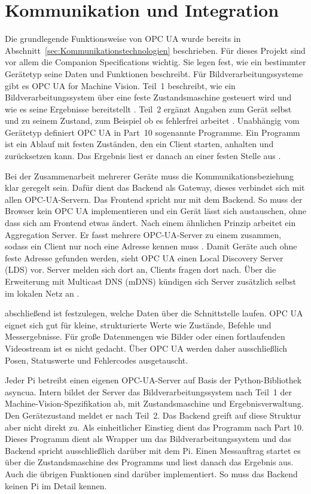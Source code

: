  \section{Kommunikation und Integration}
 \label{sec:communikation_intergration}
 Die grundlegende Funktionsweise von OPC UA wurde bereits in Abschnitt~\ref{sec:Kommunikationstechnologien} beschrieben. Für dieses Projekt sind vor allem die Companion Specifications wichtig. Sie legen fest, wie ein bestimmter Gerätetyp seine Daten und Funktionen beschreibt. Für Bildverarbeitungssysteme gibt es OPC UA for Machine Vision. Teil~1 beschreibt, wie ein Bildverarbeitungssystem über eine feste Zustandsmaschine gesteuert wird und wie es seine Ergebnisse bereitstellt \cite{OPC40100-1}. Teil~2 ergänzt Angaben zum Gerät selbst und zu seinem Zustand, zum Beispiel ob es fehlerfrei arbeitet \cite{OPC40100-2}. Unabhängig vom Gerätetyp definiert OPC UA in Part~10 sogenannte Programme. Ein Programm ist ein Ablauf mit festen Zuständen, den ein Client starten, anhalten und zurücksetzen kann. Das Ergebnis liest er danach an einer festen Stelle aus \cite{OPC10000-10}.

Bei der Zusammenarbeit mehrerer Geräte muss die Kommunikationsbeziehung klar geregelt sein. Dafür dient das Backend als Gateway, dieses verbindet sich mit allen OPC-UA-Servern. Das Frontend spricht nur mit dem Backend. So muss der Browser kein OPC UA implementieren und ein Gerät lässt sich austauschen, ohne dass sich am Frontend etwas ändert. Nach einem ähnlichen Prinzip arbeitet ein Aggregation Server. Er fasst mehrere OPC-UA-Server zu einem zusammen, sodass ein Client nur noch eine Adresse kennen muss \cite{Sain2026}. Damit Geräte auch ohne feste Adresse gefunden werden, sieht OPC UA einen Local Discovery Server (LDS) vor. Server melden sich dort an, Clients fragen dort nach. Über die Erweiterung mit Multicast DNS (mDNS) kündigen sich Server zusätzlich selbst im lokalen Netz an \cite{OPC10000-12}.

 abschließend ist festzulegen, welche Daten über die Schnittstelle laufen. OPC UA eignet sich gut für kleine, strukturierte Werte wie Zustände, Befehle und Messergebnisse. Für große Datenmengen wie Bilder oder einen fortlaufenden Videostream ist es nicht gedacht. Über OPC UA werden daher ausschließlich Posen, Statuswerte und Fehlercodes ausgetauscht.

 Jeder Pi betreibt einen eigenen OPC-UA-Server auf Basis der Python-Bibliothek asyncua. Intern bildet der Server das Bildverarbeitungssystem nach Teil~1 der Machine-Vision-Spezifikation ab, mit Zustandsmaschine und Ergebnisverwaltung. Den Gerätezustand meldet er nach Teil~2. Das Backend greift auf diese Struktur aber nicht direkt zu. Als einheitlicher Einstieg dient das Programm nach Part 10. Dieses Programm dient als Wrapper um das Bildverarbeitungssystem und das Backend spricht ausschließlich darüber mit dem Pi. Einen Messauftrag startet es über die Zustandsmaschine des Programms und liest danach das Ergebnis aus. Auch die übrigen Funktionen sind darüber implementiert. So muss das Backend keinen Pi im Detail kennen.

